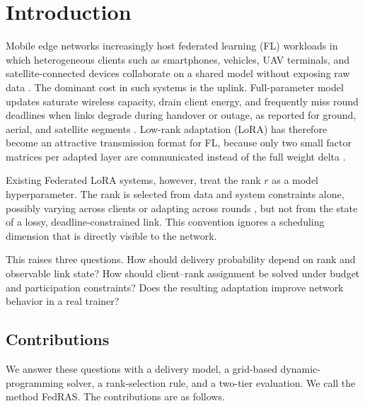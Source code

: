 \documentclass[preprint,12pt]{elsarticle}
\begin{document}
\section{Introduction}
\label{sec:intro}

Mobile edge networks increasingly host federated learning (FL) workloads in which heterogeneous clients such as smartphones, vehicles, UAV terminals, and satellite-connected devices collaborate on a shared model without exposing raw data \cite{mcmahan2017fedavg,kairouz2021advances,liu2018sagin,mahboob2024ntn}. The dominant cost in such systems is the uplink. Full-parameter model updates saturate wireless capacity, drain client energy, and frequently miss round deadlines when links degrade during handover or outage, as reported for ground, aerial, and satellite segments \cite{razmi2022ground,tang2023flsagin,qin2024dfrl,ribero2023intermittent}. Low-rank adaptation (LoRA) has therefore become an attractive transmission format for FL, because only two small factor matrices per adapted layer are communicated instead of the full weight delta \cite{hu2022lora,babakniya2023slora,zhang2024fedit}.

Existing Federated LoRA systems, however, treat the rank $r$ as a model hyperparameter. The rank is selected from data and system constraints alone, possibly varying across clients \cite{cho2024hetlora,fan2025helora} or adapting across rounds \cite{wu2026fedara,yang2024safedlora}, but not from the state of a lossy, deadline-constrained link. This convention ignores a scheduling dimension that is directly visible to the network.

This raises three questions. How should delivery probability depend on rank and observable link state? How should client--rank assignment be solved under budget and participation constraints? Does the resulting adaptation improve network behavior in a real trainer?

\subsection{Contributions}
We answer these questions with a delivery model, a grid-based dynamic-programming solver, a rank-selection rule, and a two-tier evaluation. We call the method FedRAS. The contributions are as follows.
\end{document}
